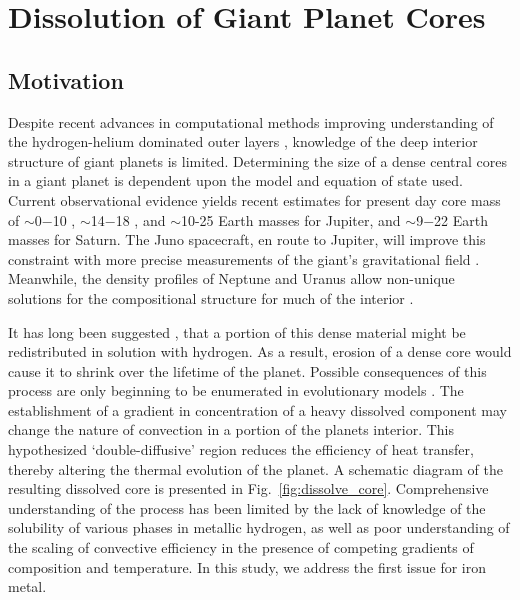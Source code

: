 \chapter{Dissolution of Giant Planet Cores}\label{chap3}

\section{Motivation}

Despite recent advances in computational methods improving understanding of the
hydrogen-helium dominated outer layers
\citep{Mcmahon2012,French2012,militzer2013a,Wilson2010}, knowledge of the deep
interior structure of giant planets is limited.  Determining the size of a
dense central cores in a giant planet is dependent upon the model and equation
of state used.  Current observational evidence yields recent estimates for
present day core mass of $\sim$0$-$10 \citep{Guillot2005},  $\sim$14$-$18
\citep{Militzer2008}, and $\sim$10-25 Earth masses \citep{Wahl2017} for
Jupiter, and $\sim$9$-$22 \citep{Guillot2005} Earth masses for Saturn.  The
Juno spacecraft, en route to Jupiter, will improve this constraint with more
precise measurements of the giant's gravitational field \citep{Helled2011}.
Meanwhile, the density profiles of Neptune and Uranus allow non-unique
solutions for the compositional structure for much of the interior
\citep{Guillot1999b,Guillot2005}.

It has long been suggested \citep{Stevenson1982a,Stevenson1982b}, that a
portion of this dense material might be redistributed in solution with
hydrogen. As a result, erosion of a dense core would cause it to shrink over
the lifetime of the planet. Possible consequences of this process are only
beginning to be enumerated in evolutionary models
\citep{Chabrier2007,Leconte2012,Mirouh2012}. The establishment of a gradient in
concentration of a heavy dissolved component may change the nature of
convection in a portion of the planets interior. This hypothesized
`double-diffusive' region reduces the efficiency of heat transfer, thereby
altering the thermal evolution of the planet. A schematic diagram of the
resulting dissolved core is presented in Fig.~\ref{fig:dissolve_core}.
Comprehensive understanding of the process has been limited by the lack of
knowledge of the solubility of various phases in metallic hydrogen, as well as
poor understanding of the scaling of convective efficiency in the presence of
competing gradients of composition and temperature. In this study, we address
the first issue for iron metal.

